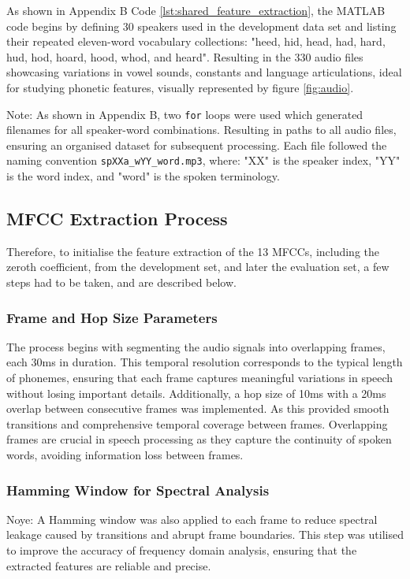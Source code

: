 \documentclass{article}
\begin{document}
As shown in Appendix B Code \ref{lst:shared_feature_extraction}, the MATLAB code begins by defining 30 speakers used in the development data set and listing their repeated eleven-word vocabulary collections: "heed, hid, head, had, hard, hud, hod, hoard, hood, whod, and heard". Resulting in the 330 audio files showcasing variations in vowel sounds, constants and language articulations, ideal for studying phonetic features, visually represented by figure \ref{fig:audio}.

Note: As shown in Appendix B, two \verb+for+ loops were used which generated filenames for all speaker-word combinations. Resulting in paths to all audio files, ensuring an organised dataset for subsequent processing. Each file followed the naming convention \verb+spXXa_wYY_word.mp3+, where: "XX" is the speaker index, "YY" is the word index, and "word" is the spoken terminology.

\subsection{MFCC Extraction Process}

Therefore, to initialise the feature extraction of the 13 MFCCs, including the zeroth coefficient, from the development set, and later the evaluation set, a few steps had to be taken, and are described below. 

\subsubsection{Frame and Hop Size Parameters}

The process begins with segmenting the audio signals into overlapping frames, each 30ms in duration. This temporal resolution corresponds to the typical length of phonemes, ensuring that each frame captures meaningful variations in speech without losing important details. Additionally, a hop size of 10ms with a 20ms overlap between consecutive frames was implemented. As this provided smooth transitions and comprehensive temporal coverage between frames. Overlapping frames are crucial in speech processing as they capture the continuity of spoken words, avoiding information loss between frames.

\subsubsection{Hamming Window for Spectral Analysis}

Noye: A Hamming window was also applied to each frame to reduce spectral leakage caused by transitions and abrupt frame boundaries. This step was utilised to improve the accuracy of frequency domain analysis, ensuring that the extracted features are reliable and precise.
\end{document}
